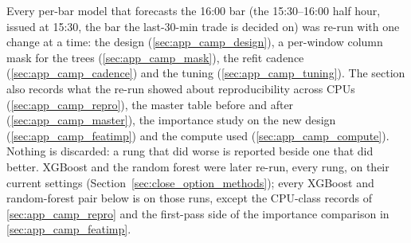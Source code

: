 Every per-bar model that forecasts the 16:00 bar (the 15:30--16:00 half hour, issued at
15:30, the bar the last-30-min trade is decided on) was re-run with one change at a time:
the design (\ref{sec:app_camp_design}), a per-window column mask for the trees
(\ref{sec:app_camp_mask}), the refit cadence (\ref{sec:app_camp_cadence}) and the tuning
(\ref{sec:app_camp_tuning}). The section also records what the re-run showed about
reproducibility across CPUs (\ref{sec:app_camp_repro}), the master table before and after
(\ref{sec:app_camp_master}), the importance study on the new design
(\ref{sec:app_camp_featimp}) and the compute used (\ref{sec:app_camp_compute}). Nothing is
discarded: a rung that did worse is reported beside one that did better.
XGBoost and the random forest were later re-run, every rung, on their current settings
(Section~\ref{sec:close_option_methods}); every XGBoost and random-forest pair below is on
those runs, except the CPU-class records of \ref{sec:app_camp_repro} and the first-pass
side of the importance comparison in \ref{sec:app_camp_featimp}.

